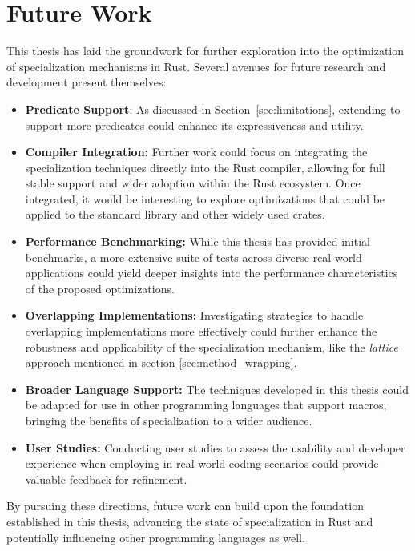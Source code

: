\chapter{Future Work}\label{chap:future_work}

This thesis has laid the groundwork for further exploration into the optimization of specialization mechanisms in Rust. Several avenues for future research and development present themselves:
\begin{itemize}
	\item \textbf{Predicate Support}: As discussed in Section~\ref{sec:limitations}, extending \mytool to support more predicates could enhance its expressiveness and utility.

	\item \textbf{Compiler Integration:} Further work could focus on integrating the specialization techniques directly into the Rust compiler, allowing for full stable support and wider adoption within the Rust ecosystem.
	      Once integrated, it would be interesting to explore optimizations that could be applied to the standard library and other widely used crates.

	\item \textbf{Performance Benchmarking:} While this thesis has provided initial benchmarks, a more extensive suite of tests across diverse real-world applications could yield deeper insights into the performance characteristics of the proposed optimizations.

	\item \textbf{Overlapping Implementations:} Investigating strategies to handle overlapping implementations more effectively could further enhance the robustness and applicability of the specialization mechanism, like the \textit{lattice} approach mentioned in section \ref{sec:method_wrapping}.

	\item \textbf{Broader Language Support:} The techniques developed in this thesis could be adapted for use in other programming languages that support macros, bringing the benefits of specialization to a wider audience.

	\item \textbf{User Studies:} Conducting user studies to assess the usability and developer experience when employing \mytool in real-world coding scenarios could provide valuable feedback for refinement.
\end{itemize}

By pursuing these directions, future work can build upon the foundation established in this thesis, advancing the state of specialization in Rust and potentially influencing other programming languages as well.
